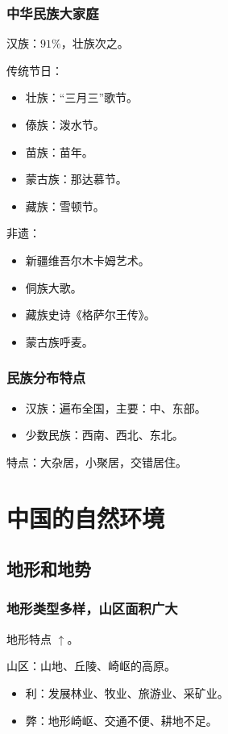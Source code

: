 \documentclass[b5paper,10pt]{book}
\begin{document}
\subsection{中华民族大家庭}
汉族：$91\%$，壮族次之。

传统节日：
\begin{itemize}
	\item 壮族：“三月三”歌节。
	\item 傣族：泼水节。
	\item 苗族：苗年。
	\item 蒙古族：那达慕节。
	\item 藏族：雪顿节。
\end{itemize}

非遗：
\begin{itemize}
	\item 新疆维吾尔木卡姆艺术。
	\item 侗族大歌。
	\item 藏族史诗《格萨尔王传》。
	\item 蒙古族呼麦。
\end{itemize}

\subsection{民族分布特点}
\begin{itemize}
	\item 汉族：遍布全国，主要：中、东部。
	\item 少数民族：西南、西北、东北。
\end{itemize}

特点：大杂居，小聚居，交错居住。

\chapter{中国的自然环境}
\section{地形和地势}
\subsection{地形类型多样，山区面积广大}

地形特点 $\uparrow$。

山区：山地、丘陵、崎岖的高原。
\begin{itemize}
	\item 利：发展林业、牧业、旅游业、采矿业。
	\item 弊：地形崎岖、交通不便、耕地不足。
\end{itemize}
\end{document}
